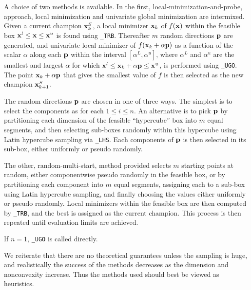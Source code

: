 \documentclass{galahad}
\begin{document}
\galmethod
A choice of two methods is available. 
In the first, local-minimization-and-probe, approach, local minimization
and univariate global minimization are intermixed. Given a current 
champion ${\mathbf{x}}^S_k$, a local minimizer ${\mathbf{x}}_k$ of $f({\mathbf{x}})$ within the
feasible box ${\mathbf{x}}^l \leq {\mathbf{x}} \leq {\mathbf{x}}^u$ is found using 
{\tt \libraryname\_TRB}.
Thereafter $m$ random directions ${\mathbf{p}}$ are generated, and univariate
local minimizer of $f({\mathbf{x}}_k + \alpha {\mathbf{p}})$ as a function of the scalar
$\alpha$ along each ${\mathbf{p}}$ within the interval $[\alpha^L,\alpha^u]$,
where $\alpha^L$ and $\alpha^u$ are the smallest and largest $\alpha$ 
for which ${\mathbf{x}}^l \leq {\mathbf{x}}_k + \alpha {\mathbf{p}} \leq {\mathbf{x}}^u$, 
is performed using {\tt \libraryname\_UGO}. The point ${\mathbf{x}}_k + \alpha {\mathbf{p}}$
that gives the smallest value of $f$ is then selected as the new champion
${\mathbf{x}}^S_{k+1}$.

The random directions ${\mathbf{p}}$ are chosen in one of three ways. The simplest is
to select the components as
for each $1 \leq i \leq n$. An alternative is to 
pick ${\mathbf{p}}$ by partitioning each dimension of the feasible ``hypercube'' box 
into $m$ equal segments, and then selecting sub-boxes
randomly within this hypercube using Latin hypercube sampling via
{\tt \libraryname\_LHS}.
Each components of ${\mathbf{p}}$ is then selected in its sub-box, either uniformly
or pseudo randomly.

The other, random-multi-start, method provided selects $m$ starting points 
at random, either componentwise pseudo randomly in the feasible box, 
or by partitioning each component into $m$ equal segments, assigning each to
a sub-box using Latin hypercube sampling, and finally choosing the
values either uniformly or pseudo randomly. Local minimizers within the
feasible box are then computed by {\tt \libraryname\_TRB}, and
the best is assigned as the current champion. This process is then
repeated until evaluation limits are achieved.

If $n=1$, {\tt \libraryname\_UGO} is called directly.

We reiterate that there are no theoretical guarantees unless the sampling 
is huge, and realistically the success of the methods decreases as the 
dimension and nonconvexity increase. Thus the methods used should best
be viewed as heuristics.
\end{document}
